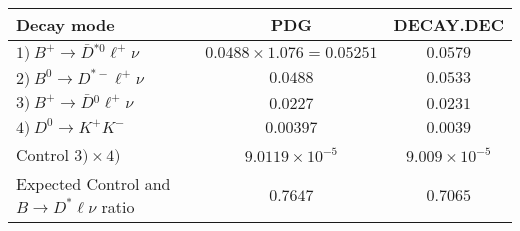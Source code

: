 \documentclass[]{standalone}
\begin{document}
\begin{tabular}{l|c|c}
Decay mode & PDG & DECAY.DEC \\
\hline
$1)~B^+ \to \bar D {}^{*0} \ell^+ \nu$ & $0.0488\times1.076 = 0.05251$ & $0.0579$ \\
$2)~B^0 \to D^{*-} \ell^+ \nu$ & $0.0488$ & $0.0533$ \\
$3)~B^+ \to \bar D {}^0 \ell^+ \nu$ & $0.0227$ & $0.0231$ \\
$4)~D^0 \to K^+ K^-$ & $0.00397$ & $0.0039$ \\
\hline 
Control $3) \times 4)$ & $9.0119\times 10^{-5}$ & $9.009\times 10^{-5}$ \\
\hline
Expected Control and $B \to D^* \ell \nu$ ratio & $0.7647$ & $0.7065$

\end{tabular}
\end{document}
